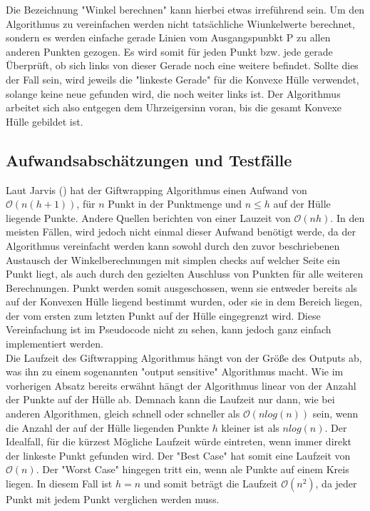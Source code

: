 \documentclass[Labor, MSC, german]{twbook}
\begin{document}
Die Bezeichnung "Winkel berechnen" kann hierbei etwas irreführend sein. Um den Algorithmus zu vereinfachen werden nicht tatsächliche Wiunkelwerte berechnet, sondern es werden einfache gerade Linien vom Ausgangspunbkt P zu allen anderen Punkten gezogen. Es wird somit für jeden Punkt bzw. jede gerade Überprüft, ob sich links von dieser Gerade noch eine weitere befindet. Sollte dies der Fall sein, wird jeweils die "linkeste Gerade" für die Konvexe Hülle verwendet, solange keine neue gefunden wird, die noch weiter links ist. Der Algorithmus arbeitet sich also entgegen dem Uhrzeigersinn voran, bis die gesamt Konvexe Hülle gebildet ist.

\subsection{Aufwandsabschätzungen und Testfälle}
Laut Jarvis (\cite{JARVIS197318}) hat der Giftwrapping Algorithmus einen Aufwand von $\mathcal{O}(n(h+1))$, für $n$ Punkt in der Punktmenge und $n\leq h$ auf der Hülle liegende Punkte. Andere Quellen berichten von einer Lauzeit von $\mathcal{O}(nh)$. In den meisten Fällen, wird jedoch nicht einmal dieser Aufwand benötigt werde, da der Algorithmus vereinfacht werden kann sowohl durch den zuvor beschriebenen Austausch der Winkelberechnungen mit simplen checks auf welcher Seite ein Punkt liegt, als auch durch den gezielten Auschluss von Punkten für alle weiteren Berechnungen. Punkt werden somit ausgeschossen, wenn sie entweder bereits als auf der Konvexen Hülle liegend bestimmt wurden, oder sie in dem Bereich liegen, der vom ersten zum letzten Punkt auf der Hülle eingegrenzt wird. Diese Vereinfachung ist im Pseudocode nicht zu sehen, kann jedoch ganz einfach implementiert werden.\\

Die Laufzeit des Giftwrapping Algorithmus hängt von der Größe des Outputs ab, was ihn zu einem sogenannten "output sensitive" Algorithmus macht. Wie im vorherigen Absatz bereits erwähnt hängt der Algorithmus linear von der Anzahl der Punkte auf der Hülle ab. Demnach kann die Laufzeit nur dann, wie bei anderen Algorithmen, gleich schnell oder schneller als $\mathcal{O}(nlog(n))$ sein, wenn die Anzahl der auf der Hülle liegenden Punkte $h$ kleiner ist als $nlog(n)$. Der Idealfall, für die kürzest Mögliche Laufzeit würde eintreten, wenn immer direkt der linkeste Punkt gefunden wird. Der "Best Case" hat somit eine Laufzeit von  $\mathcal{O}(n)$. Der "Worst Case" hingegen tritt ein, wenn ale Punkte auf einem Kreis liegen. In diesem Fall ist 
$h=n$ und somit beträgt die Laufzeit $\mathcal{O}(n^2)$, da jeder Punkt mit jedem Punkt verglichen werden muss.


\clearpage


\end{document}
